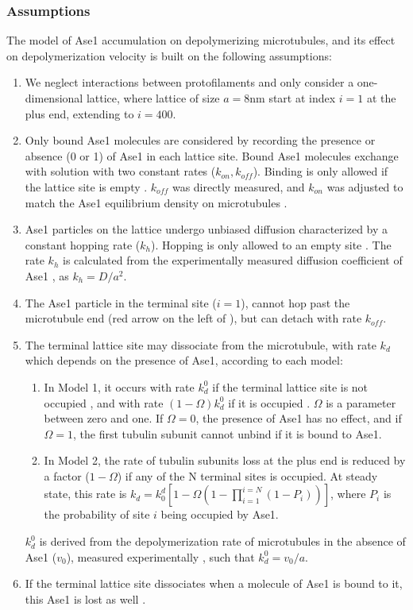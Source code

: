 \subsubsection{Assumptions}
The model of Ase1 accumulation on depolymerizing microtubules, and its effect on depolymerization velocity  is built on the following assumptions:
\begin{enumerate}
	\item We neglect interactions between protofilaments and only consider a one-dimensional lattice, where lattice of size $a=8$nm start at index $i=1$ at the plus end, extending to $i=400$. 
	\item Only bound Ase1 molecules are considered by recording the presence or absence (0 or 1) of Ase1 in each lattice site. Bound Ase1 molecules exchange with solution with two constant rates ($k_{on},k_{off}$). Binding is only allowed if the lattice site is empty . $k_{off}$ was directly measured, and $k_{on}$ was adjusted to match the Ase1 equilibrium density on microtubules .
	\item Ase1 particles on the lattice undergo unbiased diffusion characterized by a constant hopping rate ($k_h$). Hopping is only allowed to an empty site . The rate $k_h$ is calculated from the experimentally measured diffusion coefficient of Ase1 , as $k_h=D/a^2$.
	\item The Ase1 particle in the terminal site ($i=1$), cannot hop past the microtubule end (red arrow on the left of ), but can detach with rate $k_{off}$.
	\item The terminal lattice site may dissociate from the microtubule, with rate $k_d$ which depends on the presence of Ase1, according to each model:
	\begin{enumerate}
		\item In Model 1, it occurs with rate $k_d^0$ if the terminal lattice site is not occupied , and with rate $(1-\Omega)k_d^0$ if it is occupied . $\Omega$ is a parameter between zero and one. If $\Omega=0$, the presence of Ase1 has no effect, and if $\Omega=1$, the first tubulin subunit cannot unbind if it is bound to Ase1.
		\item In Model 2, the rate of tubulin subunits loss at the plus end is reduced by a factor ($1-\Omega$) if any of the N terminal sites is occupied. At steady state, this rate is $k_d=k_0^d [1-\Omega(1-\prod_{i=1}^{i=N}(1-P_i))]$, where $P_i$ is the probability of site $i$ being occupied by Ase1.
	\end{enumerate} 
	$k_d^0$ is derived from the depolymerization rate of microtubules in the absence of Ase1 ($v_0$), measured experimentally , such that  $k_d^0=v_0/a$.
	\item If the terminal lattice site dissociates when a molecule of Ase1 is bound to it, this Ase1 is lost as well .
\end{enumerate}
	
